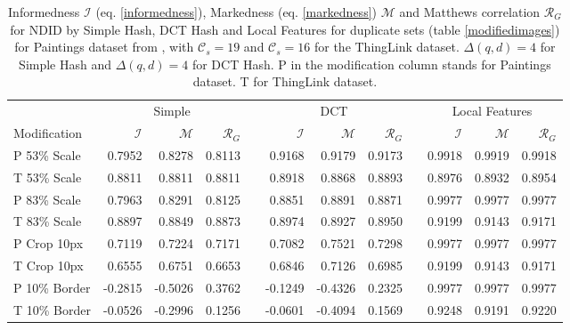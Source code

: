 \documentclass[english,12pt,a4paper,pdftex,elec,utf8, table]{aaltothesis}
\begin{document}
\begin{table} \footnotesize
\caption{ Informedness $\mathcal{I}$ (eq. \ref{informedness}), Markedness (eq. \ref{markedness}) $\mathcal{M}$ and Matthews correlation $\mathcal{R}_G$ for NDID by Simple Hash, DCT Hash and Local Features for duplicate sets (table \ref{modifiedimages}) for Paintings dataset from \cite{Vedaldi2012}, with $\mathcal{C}_s = 19$ and $\mathcal{C}_s = 16$ for the ThingLink dataset. $\Delta(q,d) = 4$ for Simple Hash and $\Delta(q,d) = 4$ for DCT Hash. P in the modification column stands for Paintings dataset. T for ThingLink dataset.}
\label{informednessmarkedness}
\begin{center}
  \setlength\tabcolsep{1.5pt} %
  \begin{tabular}{@{}lrrrrrrrrrrr@{}}
    \toprule
    & \multicolumn{3}{c}{Simple} &\phantom{abc} &\multicolumn{3}{c}{DCT} &\phantom{abc} & \multicolumn{3}{c}{Local Features}\\
\cmidrule{2-4} \cmidrule{6-8} \cmidrule{10-12}
 Modification & $\mathcal{I}$ & $\mathcal{M}$ & $\mathcal{R}_G$ &\phantom{abc} & $\mathcal{I}$ & $\mathcal{M}$ & $\mathcal{R}_G$ &\phantom{abc} & $\mathcal{I}$ & $\mathcal{M}$ & $\mathcal{R}_G$\\ \midrule
 P 53\% Scale   & 0.7952 & 0.8278 & 0.8113 &\phantom{abc} & 0.9168 & 0.9179 & 0.9173 &\phantom{abc} & 0.9918 & 0.9919 & 0.9918\\
 T 53\% Scale   & 0.8811 & 0.8811 & 0.8811 &\phantom{abc} & 0.8918 & 0.8868 & 0.8893 &\phantom{abc} & 0.8976 & 0.8932 & 0.8954\\
 P 83\% Scale   & 0.7963 & 0.8291 & 0.8125 &\phantom{abc} & 0.8851 & 0.8891& 0.8871 &\phantom{abc} & 0.9977 & 0.9977 & 0.9977 \\
 T 83\% Scale   & 0.8897 & 0.8849 & 0.8873 &\phantom{abc} & 0.8974 & 0.8927 & 0.8950  &\phantom{abc} & 0.9199 & 0.9143 & 0.9171 \\
 P Crop 10px    & 0.7119 & 0.7224 & 0.7171 &\phantom{abc} & 0.7082 & 0.7521 & 0.7298&\phantom{abc} & 0.9977 & 0.9977 & 0.9977 \\
 T Crop 10px    & 0.6555 & 0.6751 & 0.6653 &\phantom{abc} & 0.6846& 0.7126 & 0.6985 &\phantom{abc} & 0.9199& 0.9143 & 0.9171 \\
 P 10\% Border  & -0.2815 & -0.5026 & 0.3762 & \phantom{abc} & -0.1249 & -0.4326 & 0.2325 &\phantom{abc} & 0.9977 & 0.9977 & 0.9977 \\
 T 10\% Border  & -0.0526 & -0.2996 & 0.1256 & \phantom{abc} & -0.0601 & -0.4094 & 0.1569 &\phantom{abc} & 0.9248 & 0.9191& 0.9220 \\

\end{tabular}
\end{center}
\end{table}
\end{document}
